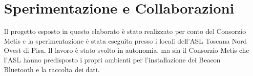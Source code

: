 \documentclass[draft]{standalone}
\begin{document}
\section{Sperimentazione e Collaborazioni}
Il progetto esposto in questo elaborato è stato realizzato per conto del
Consorzio Metis e la sperimentazione è stata eseguita presso i locali dell'ASL
Toscana Nord Ovest di Pisa. Il lavoro è stato svolto in autonomia, ma sia il
Consorzio Metis che l'ASL hanno predisposto i propri ambienti per
l'installazione dei Beacon Bluetooth e la raccolta dei dati.

\end{document}
